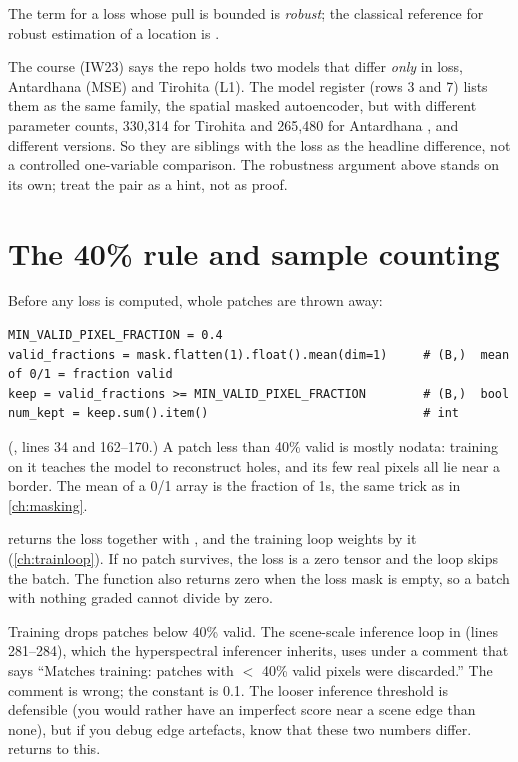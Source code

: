 The term for a loss whose pull is bounded is \emph{robust}; the classical
reference for robust estimation of a location is \citet{huber1964robust}.

\begin{sourcenote}
The course (IW23) says the repo holds two models that differ \emph{only} in loss, Antardhana
(MSE) and Tirohita (L1). The model register  (rows 3
and 7) lists them as the same family, the spatial masked autoencoder, but with different
parameter counts, 330,314 for Tirohita and 265,480 for
Antardhana , and different versions. So they are
siblings with the loss as the headline difference, not a controlled one-variable comparison.
The robustness argument above stands on its own; treat the pair as a hint, not as proof.
\end{sourcenote}

\section{The 40\% rule and sample counting}\label{sec:losses:forty}

Before any loss is computed, whole patches are thrown away:
\begin{lstlisting}
MIN_VALID_PIXEL_FRACTION = 0.4
valid_fractions = mask.flatten(1).float().mean(dim=1)     # (B,)  mean of 0/1 = fraction valid
keep = valid_fractions >= MIN_VALID_PIXEL_FRACTION        # (B,)  bool
num_kept = keep.sum().item()                              # int
\end{lstlisting}
(, lines 34 and
162--170.) A patch less than 40\% valid is mostly nodata: training on it teaches the model to
reconstruct holes, and its few real pixels all lie near a border. The mean of a 0/1 array is
the fraction of 1s, the same trick as in \cref{ch:masking}.

 returns the loss together with , and the training loop
weights by it (\cref{ch:trainloop}). If no patch survives, the loss is a zero tensor and the
loop skips the batch. The function also returns zero when the loss mask is empty, so a
batch with nothing graded cannot divide by zero.

\begin{sourcenote}
Training drops patches below 40\% valid. The scene-scale inference loop in
 (lines 281--284), which the
hyperspectral inferencer inherits, uses  under a comment that
says ``Matches training: patches with $<$ 40\% valid pixels were discarded.'' The comment is
wrong; the constant is 0.1. The looser inference threshold is defensible (you would rather
have an imperfect score near a scene edge than none), but if you debug edge artefacts, know
that these two numbers differ.  returns to this.
\end{sourcenote}

